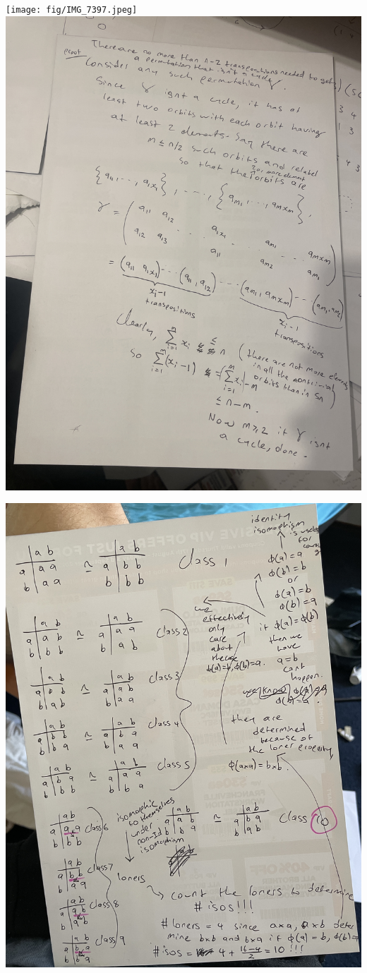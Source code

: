 \begin{center}
\texttt{[image: fig/IMG\_7397.jpeg]}
\includegraphics[scale=0.5, angle=-90]{fig/IMG_7398.jpeg}
\end{center}



\begin{center}
\includegraphics[scale=0.1, angle=-90]{fig/IMG_7272.jpeg}
\end{center}
